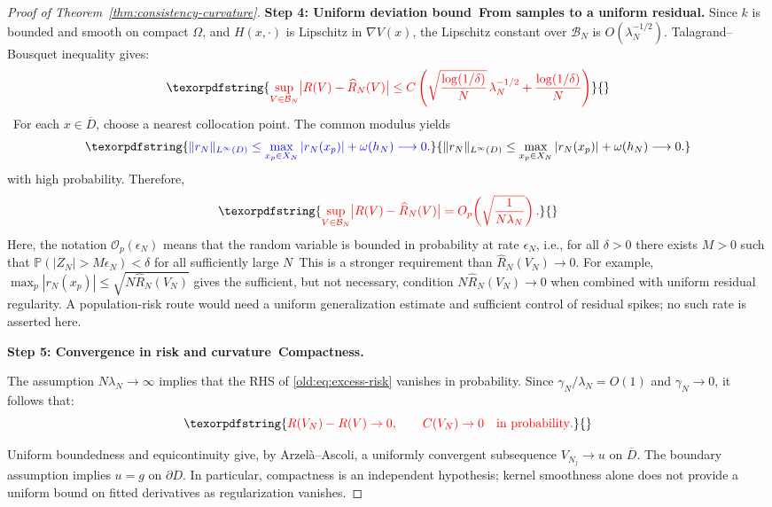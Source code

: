 \documentclass[11pt]{article}
\theoremstyle{plain}      %
\theoremstyle{definition} %
\providecommand{\DIFaddtex}[1]{{\protect\color{blue}#1}} %
\providecommand{\DIFdeltex}[1]{{\protect\color{red}#1}} %
\providecommand{\DIFaddbegin}{} %
\providecommand{\DIFaddend}{} %
\providecommand{\DIFdelbegin}{} %
\providecommand{\DIFdelend}{} %
\providecommand{\DIFadd}[1]{\texorpdfstring{\DIFaddtex{#1}}{#1}} %
\providecommand{\DIFdel}[1]{\texorpdfstring{\DIFdeltex{#1}}{}} %
\newcommand{\DIFscaledelfig}{1.0}
\newlength{\DIFdelgraphicswidth} %
\newlength{\DIFdelgraphicsheight} %
\newcommand{\DIFaddincludegraphics}[2][]{{\color{blue}\fbox{\DIFOincludegraphics[#1]{#2}}}} %
\newcommand{\DIFdelincludegraphics}[2][]{%
\sbox{\DIFdelgraphicsbox}{\DIFOincludegraphics[#1]{#2}}%
\settoboxwidth{\DIFdelgraphicswidth}{\DIFdelgraphicsbox} %
\settoboxtotalheight{\DIFdelgraphicsheight}{\DIFdelgraphicsbox} %
\scalebox{\DIFscaledelfig}{%
\parbox[b]{\DIFdelgraphicswidth}{\usebox{\DIFdelgraphicsbox}\\[-\baselineskip] \rule{\DIFdelgraphicswidth}{0em}}\llap{\resizebox{\DIFdelgraphicswidth}{\DIFdelgraphicsheight}{%
\setlength{\unitlength}{\DIFdelgraphicswidth}%
\begin{picture}(1,1)%
\thicklines\linethickness{2pt} %
{\color[rgb]{1,0,0}\put(0,0){\framebox(1,1){}}}%
{\color[rgb]{1,0,0}\put(0,0){\line( 1,1){1}}}%
{\color[rgb]{1,0,0}\put(0,1){\line(1,-1){1}}}%
\end{picture}%
}\hspace*{3pt}}} %
} %
\DeclareRobustCommand{\DIFaddbegin}{\DIFOaddbegin \let\includegraphics\DIFaddincludegraphics} %
\DeclareRobustCommand{\DIFaddend}{\DIFOaddend \let\includegraphics\DIFOincludegraphics} %
\DeclareRobustCommand{\DIFdelbegin}{\DIFOdelbegin \let\includegraphics\DIFdelincludegraphics} %
\DeclareRobustCommand{\DIFdelend}{\DIFOaddend \let\includegraphics\DIFOincludegraphics} %
\begin{document}
\begin{proof}[Proof of Theorem~\ref{thm:consistency-curvature}]
\medskip\noindent\textbf{Step 4: \DIFdelbegin \DIFdel{Uniform deviation bound}\DIFdelend\ \DIFaddbegin \DIFadd{From samples to a uniform residual}\DIFaddend .}
\DIFdelbegin \DIFdel{Since $k$ is bounded and smooth on compact $\Omega$, and $H(x,\cdot)$ is Lipschitz in $\nabla V(x)$, the Lipschitz constant over $\mathcal B_{N}$ is $O(\lambda_{N}^{-1/2})$. Talagrand–Bousquet inequality gives:
}\[
  \DIFdel{\sup_{V\in\mathcal B_{N}}
  \bigl|R(V)-\widehat R_{N}(V)\bigr|
  \le
  C\left( \sqrt{\frac{\log(1/\delta)}{N}}\,\lambda_{N}^{-1/2}
         + \frac{\log(1/\delta)}{N} \right)
}\]%
\DIFdelend\ \DIFaddbegin \DIFadd{For each $x\in\overline D$, choose a nearest collocation point. The common modulus yields
}\begin{equation}\DIFadd{\label{eq:uniform-residual}
 \|r_N\|_{L^\infty(D)}
 \leq \max_{x_p\in X_N}|r_N(x_p)|+\omega(h_N)\longrightarrow0.
}\end{equation}\DIFaddend 
\DIFdelbegin \DIFdel{with high probability. Therefore,
}\[
  \DIFdel{\sup_{V\in\mathcal B_{N}} \bigl|R(V)-\widehat R_{N}(V)\bigr| = O_{p}\!\left(\sqrt{\frac{1}{N\lambda_{N}}}\right).
}\]%
\DIFdel{Here, the notation $\mathcal{O}_p(\epsilon_N)$ means that the random variable is bounded in probability at rate $\epsilon_N$, i.e., for all $\delta > 0$ there exists $M > 0$ such that
$\mathbb{P}(|Z_N| > M\epsilon_N) < \delta$ for all sufficiently large $N$}\DIFdelend\ \DIFaddbegin \DIFadd{This is a stronger requirement than $\widehat R_N(V_N)\to0$. For example,
$\max_p|r_N(x_p)|\leq\sqrt{N\widehat R_N(V_N)}$ gives the sufficient, but not necessary, condition $N\widehat R_N(V_N)\to0$ when combined with uniform residual regularity. A population-risk route would need a uniform generalization estimate and sufficient control of residual spikes; no such rate is asserted here}\DIFaddend .

\medskip\noindent\textbf{Step 5: \DIFdelbegin \DIFdel{Convergence in risk and curvature}\DIFdelend\ \DIFaddbegin \DIFadd{Compactness}\DIFaddend .}\par
\DIFdelbegin %
\DIFdel{The assumption $N\lambda_{N}\to\infty$ implies that the RHS of \eqref{old:eq:excess-risk} vanishes in probability. Since $\gamma_{N}/\lambda_{N}=O(1)$ and $\gamma_{N}\to 0$, it follows that:
}\[
\DIFdel{R(V_N) - R(V) \to 0, \qquad C(V_N) \to 0 \quad \text{in probability}.
}\]%
\DIFdelend \DIFaddbegin
\DIFadd{Uniform boundedness and equicontinuity give, by Arzel\`a--Ascoli, a uniformly convergent subsequence $V_{N_j}\to u$ on $\overline D$. The boundary assumption implies $u=g$ on $\partial D$. In particular, compactness is an independent hypothesis; kernel smoothness alone does not provide a uniform bound on fitted derivatives as regularization vanishes.
}\DIFaddend 


\end{proof}
\end{document}
